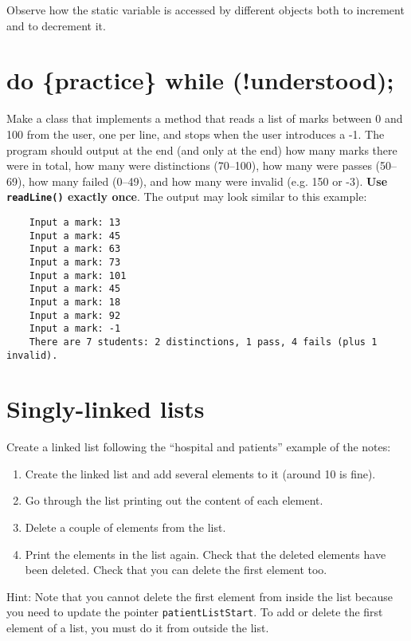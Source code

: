 \documentclass{article}
\begin{document}
Observe how the static variable is accessed by different objects both
to increment and to decrement it. 

\section{do \{practice\} while (!understood);}
\label{sec:do-practice-while}

Make a class that implements a method 
that reads a list of marks between 0 and 100 from the
user, one per line, and stops when the user introduces a -1. The
program should output at the end (and only at the end) how many marks
there were in total, how many were distinctions (70--100), how many
were passes (50--69), how many failed (0--49), and how many were
invalid (e.g. 150 or -3). \textbf{Use \texttt{readLine()} exactly once}. The
output may look similar to this example: 

\begin{verbatim}
    Input a mark: 13
    Input a mark: 45
    Input a mark: 63
    Input a mark: 73
    Input a mark: 101
    Input a mark: 45
    Input a mark: 18
    Input a mark: 92
    Input a mark: -1
    There are 7 students: 2 distinctions, 1 pass, 4 fails (plus 1 invalid). 
\end{verbatim}

\section{Singly-linked lists}
\label{sec:doubly-linked-lists}

Create a linked list following  the ``hospital and patients'' example
of the notes:

\begin{enumerate}
\item Create the linked list and add several elements to it
  (around 10 is fine). 
\item Go through the list printing out the content of
  each element.
\item Delete a couple of elements from the list. 
\item Print the elements in the list again. Check that the deleted
  elements have been deleted. Check that you can delete the first
  element too. 
\end{enumerate}

Hint: Note that you cannot delete the first element from inside the
list because you need to update the pointer
\verb+patientListStart+. To add or delete the first element of a list,
you must do it from outside the list. 
\end{document}
